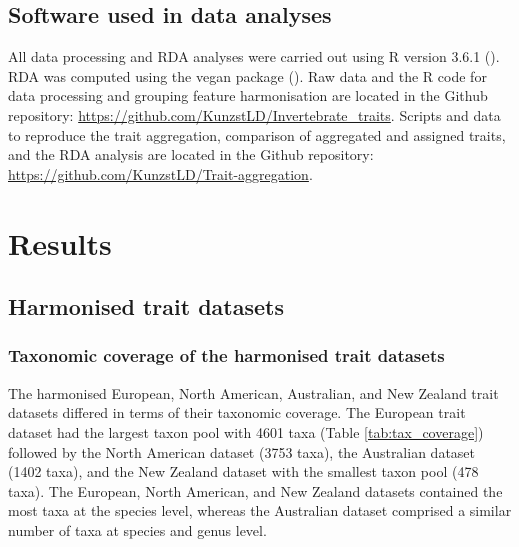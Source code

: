 \documentclass[12pt]{article}
\begin{document}

\subsection*{Software used in data analyses}

All data processing and RDA analyses were carried out using R version 3.6.1 (\cite{cite_R}). RDA was computed using the vegan package (\cite{cite_vegan}). Raw data and the R code for data processing and grouping feature harmonisation are located in the Github repository: \url{https://github.com/KunzstLD/Invertebrate_traits}. Scripts and data to reproduce the trait aggregation, comparison of aggregated and assigned traits, and the RDA analysis are located in the Github repository: \url{https://github.com/KunzstLD/Trait-aggregation}.

\newpage


\section*{Results}

\subsection*{Harmonised trait datasets}

\subsubsection*{Taxonomic coverage of the harmonised trait datasets}

The harmonised European, North American, Australian, and New Zealand trait datasets differed in terms of their taxonomic coverage. The European trait dataset had the largest taxon pool with 4601 taxa (Table \ref{tab:tax_coverage}) followed by the North American dataset (3753 taxa), the Australian dataset (1402 taxa), and the New Zealand dataset with the smallest taxon pool (478 taxa). The European, North American, and New Zealand datasets contained the most taxa at the species level, whereas the Australian dataset comprised a similar number of taxa at species and genus level.

\end{document}
